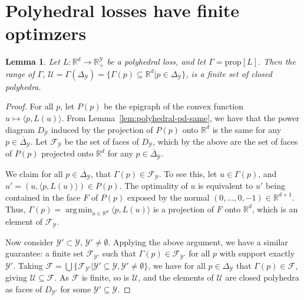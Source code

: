 \documentclass[12pt]{article}
\newcommand{\reals}{\mathbb{R}}
\newcommand{\prop}[1]{\mathrm{prop}[#1]}
\newcommand{\simplex}{\Delta_\Y}
\newcommand{\F}{\mathcal{F}}
\newcommand{\U}{\mathcal{U}}
\newcommand{\Y}{\mathcal{Y}}
\newcommand{\inprod}[2]{\langle #1, #2 \rangle}%
\newcommand{\inter}[1]{\mathring{#1}}%
\DeclareMathOperator*{\argmin}{arg\,min}
\newtheorem{lemma}{Lemma}
\begin{document}
\section{Polyhedral losses have finite optimzers}\label{app:pf-polyhedral-range-gamma}
\begin{lemma}
  \label{lem:polyhedral-range-gamma}
  Let $L:\reals^d\to\reals_+^\Y$ be a polyhedral loss, and let $\Gamma = \prop{L}$.
  Then the range of $\Gamma$, $\U = \Gamma(\simplex) = \{\Gamma(p) \subseteq \reals^d | p\in\simplex\}$, is a finite set of closed polyhedra.
\end{lemma}
\begin{proof}
  For all $p$, let $P(p)$ be the epigraph of the convex function $u\mapsto \inprod{p}{L(u)}$.
  From Lemma~\ref{lem:polyhedral-pd-same}, we have that the power diagram $D_\Y$ induced by the projection of $P(p)$ onto $\reals^d$ is the same for any $p\in\inter\simplex$.
  Let $\F_\Y$ be the set of faces of $D_\Y$, which by the above are the set of faces of $P(p)$ projected onto $\reals^d$ for any $p\in\inter\simplex$.

  We claim for all $p\in\inter\simplex$, that $\Gamma(p) \in \F_\Y$.
  To see this, let $u \in \Gamma(p)$, and $u' = (u,\inprod{p}{L(u)}) \in P(p)$.
  The optimality of $u$ is equivalent to $u'$ being contained in the face $F$ of $P(p)$ exposed by the normal $(0,\ldots,0,-1)\in\reals^{d+1}$.
  Thus, $\Gamma(p) = \argmin_{u\in\reals^d} \inprod{p}{L(u)}$ is a projection of $F$ onto $\reals^d$, which is an element of $\F_\Y$.

  Now consider $\Y'\subset \Y$, $\Y'\neq\emptyset$.
  Applying the above argument, we have a similar guarantee: a finite set $\F_{\Y'}$ such that $\Gamma(p) \in \F_{\Y'}$ for all $p$ with support exactly $\Y'$.
  Taking $\F = \bigcup\{\F_{\Y'} | \Y'\subseteq\Y, \Y'\neq\emptyset\}$, we have for all $p\in\simplex$ that $\Gamma(p) \in \F$, giving $\U \subseteq \F$.
  As $\F$ is finite, so is $\U$, and the elements of $\U$ are closed polyhedra as faces of $D_{\Y'}$ for some $\Y'\subseteq\Y$.
\end{proof}
\end{document}
